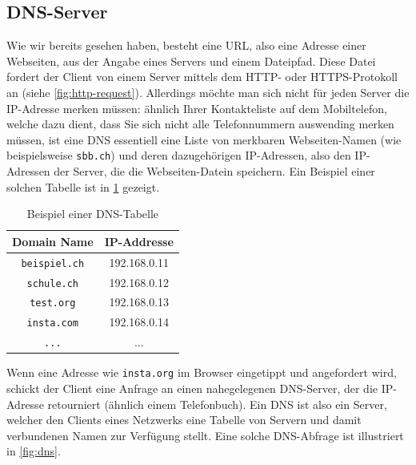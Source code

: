 \subsection{\texorpdfstring{\gls{DNS}-Server}{DNS-Server}}
Wie wir bereits gesehen haben, besteht eine \gls{URL}, also eine Adresse einer Webseiten, aus der Angabe eines Servers und einem Dateipfad. Diese Datei fordert der Client von einem Server mittels dem \gls{HTTP}- oder \gls{HTTPS}-Protokoll an (siehe \cref{fig:http-request}). Allerdings möchte man sich nicht für jeden Server die IP-Adresse merken müssen: ähnlich Ihrer Kontakteliste auf dem Mobiltelefon, welche dazu dient, dass Sie sich nicht alle Telefonnummern auswending merken müssen, ist eine \gls{DNS} essentiell eine Liste von merkbaren Webseiten-Namen (wie beispielsweise \texttt{sbb.ch}) und deren dazugehörigen \gls{IP}-Adressen, also den \gls{IP}-Adressen der Server, die die Webseiten-Datein speichern. Ein Beispiel einer solchen Tabelle ist in \cref{tab:dnsEntries} gezeigt.

\begin{table}[H]
	\centering
	\begin{tabular}{c|c}
		\textbf{Domain Name} & \textbf{IP-Addresse} \\
		\midrule\midrule
		\texttt{beispiel.ch} & 192.168.0.11         \\
		\midrule
		\texttt{schule.ch}   & 192.168.0.12         \\
		\midrule
		\texttt{test.org}    & 192.168.0.13         \\
		\midrule
		\texttt{insta.com}   & 192.168.0.14         \\
		\midrule
		\texttt{...}         & ...                  \\
	\end{tabular}
	\caption{Beispiel einer \gls{DNS}-Tabelle}
	\label{tab:dnsEntries}
\end{table}

Wenn eine Adresse wie \texttt{insta.org} im Browser eingetippt und angefordert wird, schickt der Client eine Anfrage an einen nahegelegenen \gls{DNS}-Server, der die \gls{IP}-Adresse retourniert (ähnlich einem Telefonbuch). Ein \gls{DNS} ist also ein Server, welcher den Clients eines Netzwerks eine Tabelle von Servern und damit verbundenen Namen zur Verfügung stellt. Eine solche \gls{DNS}-Abfrage ist illustriert in \cref{fig:dns}.

